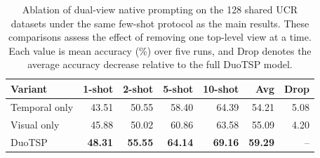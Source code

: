 \begin{table}[t]
\centering
\caption{Ablation of dual-view native prompting on the 128 shared UCR datasets under the same few-shot protocol as the main results. These comparisons assess the effect of removing one top-level view at a time. Each value is mean accuracy (\%) over five runs, and Drop denotes the average accuracy decrease relative to the full DuoTSP model.}
\label{tab:ablation-dual-view}
\begin{tabular}{lrrrrrr}
\toprule
Variant & 1-shot & 2-shot & 5-shot & 10-shot & Avg & Drop \\
\midrule
Temporal only & 43.51 & 50.55 & 58.40 & 64.39 & 54.21 & 5.08 \\
Visual only & 45.88 & 50.02 & 60.86 & 63.58 & 55.09 & 4.20 \\
DuoTSP & \textbf{48.31} & \textbf{55.55} & \textbf{64.14} & \textbf{69.16} & \textbf{59.29} & -- \\
\bottomrule
\end{tabular}
\end{table}

